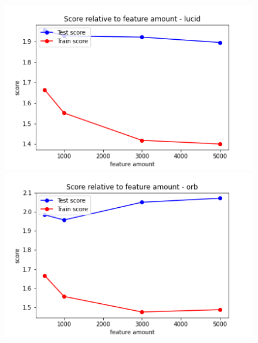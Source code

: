 \begin{figure}[H]
  \centering
  \begin{minipage}[b]{0.4\textwidth}
    \includegraphics[width=\textwidth]{images/2-LBM-feature_amount_lucid_large_values.png}
  \end{minipage}
  \hfill
  \begin{minipage}[b]{0.4\textwidth}
    \includegraphics[width=\textwidth]{images/2-LBM-feature_amount_orb_large_values.png}
  \end{minipage}
\end{figure}

